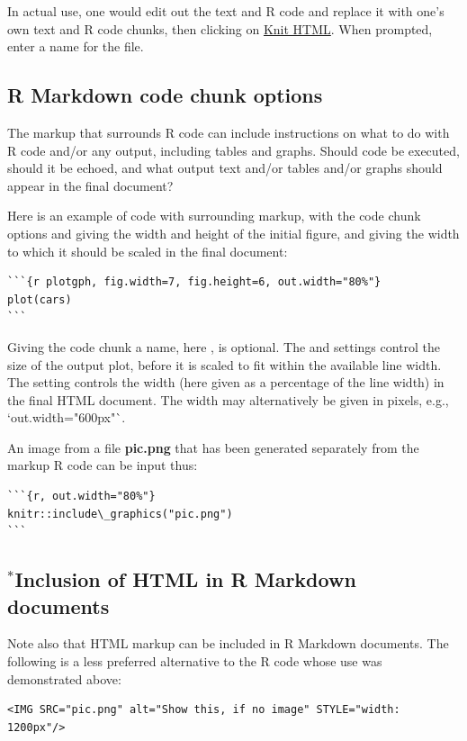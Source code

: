 In actual use, one would edit out the text and R code and replace
it with one's own text and R code chunks, then clicking on
\underline{Knit HTML}. When prompted, enter a name for the file.


\subsection*{R Markdown code chunk options}
The markup that surrounds R code can include instructions on what to
do with R code and/or any output, including tables and graphs. Should
code be executed, should it be echoed, and what output text and/or
tables and/or graphs should appear in the final document?

Here is an example of code with surrounding markup, with the
code chunk options  and 
giving the width and height of the initial figure, and
 giving the width to which it should be scaled
in the final document:
\begin{minipage}[t]{1.05\textwidth}
\begin{verbatim}
```{r plotgph, fig.width=7, fig.height=6, out.width="80%"}
plot(cars)
```
\end{verbatim}
\end{minipage}

Giving the code chunk a name, here , is optional.
 The  and  settings
  control the size of the output plot, before it is scaled to fit
  within the available line width.  The  setting
  controls the width (here given as a percentage of the line
  width) in the final HTML document.  The width may alternatively
  be given in pixels, e.g., `out.width="600px"`.
  
An image from a file {\bf pic.png} that has been generated
separately from the markup R code can be input thus:

\begin{minipage}[t]{1.05\textwidth}
\begin{verbatim}
```{r, out.width="80%"}
knitr::include\_graphics("pic.png")
```
\end{verbatim}
\end{minipage}
  
\subsection*{$^*$Inclusion of HTML in R Markdown documents}
Note also that HTML markup can be included in R Markdown documents.
The following is a less preferred alternative to the
R code  whose use was
demonstrated above:
\begin{verbatim}
<IMG SRC="pic.png" alt="Show this, if no image" STYLE="width: 1200px"/>
\end{verbatim}

